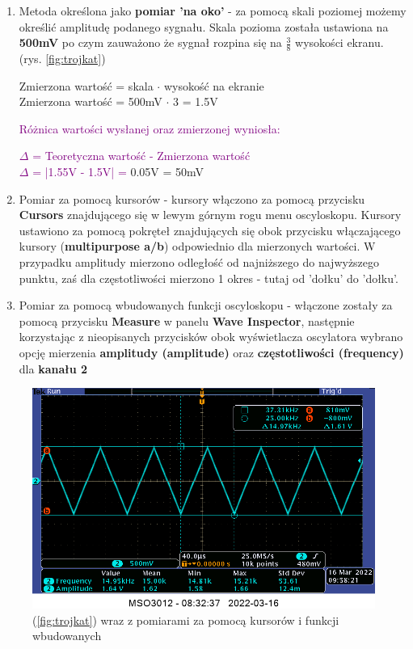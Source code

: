 \label{ad:roznica_2_3-1}
\begin{enumerate}
    \item Metoda określona jako \textbf{pomiar 'na oko'} - za pomocą skali poziomej możemy określić amplitudę podanego sygnału. Skala pozioma została ustawiona na \textbf{500mV} po czym zauważono że sygnał rozpina się na $\frac{3}{8}$ wysokości ekranu. (rys. \ref{fig:trojkat})
    \begin{center}
        Zmierzona wartość = skala $\cdot$ wysokość na ekranie \\
        Zmierzona wartość = 500mV $\cdot$ 3 = 1.5V \\
    \end{center}
        \textcolor{purple}{Różnica wartości wysłanej oraz zmierzonej wyniosła:} 
    \begin{center}
        \textcolor{purple}{$\Delta$ = Teoretyczna wartość - Zmierzona wartość \\ $\Delta$ = |1.55V - 1.5V| =} 0.05V = 50mV
    \end{center}
    
    \item Pomiar za pomocą kursorów - kursory włączono za pomocą przycisku \textbf{Cursors} znajdującego się w lewym górnym rogu menu oscyloskopu. Kursory ustawiono za pomocą pokręteł znajdujących się obok przycisku włączającego kursory (\textbf{multipurpose a/b}) odpowiednio dla mierzonych wartości. W przypadku amplitudy mierzono odległość od najniższego do najwyższego punktu, zaś dla częstotliwości mierzono 1 okres - tutaj od 'dołku' do 'dołku'.
    
    \item Pomiar za pomocą wbudowanych funkcji oscyloskopu - włączone zostały za pomocą przycisku \textbf{Measure} w panelu \textbf{Wave Inspector}, następnie korzystając z nieopisanych przycisków obok wyświetlacza oscylatora wybrano opcję mierzenia \textbf{amplitudy (amplitude)} oraz \textbf{częstotliwości (frequency)} dla \textbf{kanału 2}
\end{enumerate}

\begin{figure}[h]
    \centering
    \includegraphics[scale = 0.5]{images/1_3measurement_smaller.png}
    \caption{(\ref{fig:trojkat}) wraz z pomiarami za pomocą kursorów i funkcji wbudowanych}
    \label{fig:trojkat_pomiary}
\end{figure}

